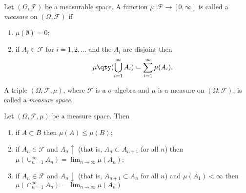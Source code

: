 \documentclass{maths}
\newcommand{\alg}{\mathcal{F}}
\begin{document}
\begin{defn}
    Let $(\Omega,\alg)$ be a measurable space.
    A function $\mu\colon\alg\to[0,\infty]$ is called a \emph{measure} on $(\Omega,\alg)$ if
    \begin{enumerate}
        \item $\mu(\emptyset)=0$;
        \item if $A_i\in\alg$ for $i=1,2,\ldots$ and the $A_i$ are disjoint then
        \[
            \mu\qty(\bigcup_{i=1}^{\infty} A_i) =
            \sum_{i=1}^{\infty} \mu(A_i).
        \]
    \end{enumerate}

    A triple $(\Omega,\alg,\mu)$, where $\alg$ is a $\sigma$-algebra and $\mu$ is a measure on $(\Omega,\alg)$, is called a \emph{measure space}.
\end{defn}

\begin{prop}
    Let $(\Omega,\alg,\mu)$ be a measure space.
    Then
    \begin{enumerate}
        \item if $A\subset B$ then $\mu(A)\leqslant\mu(B)$;
        \item if $A_n\in\alg$ and $A_n\uparrow$ (that is, $A_n\subset A_{n+1}$ for all $n$) then $\mu(\cup_{n=1}^{\infty} A_n) = \lim_{n\to\infty} \mu(A_n)$;
        \item if $A_n\in\alg$ and $A_n\downarrow$ (that is, $A_{n+1}\subset A_n$ for all $n$) and $\mu(A_1)<\infty$ then $\mu(\cap_{n=1}^{\infty} A_n) = \lim_{n\to\infty} \mu(A_n)$
    \end{enumerate}
\end{prop}
\end{document}
